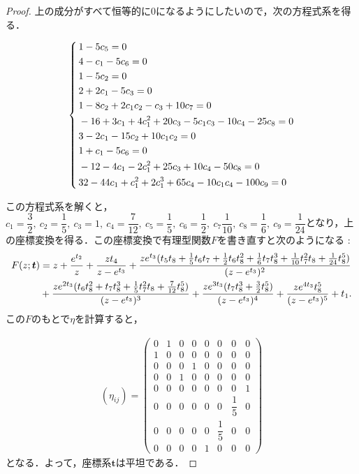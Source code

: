 \documentclass[a4paper,11pt]{jbook}
\theoremstyle{plain}
\theoremstyle{definition}
\theoremstyle{remark}
\theoremstyle{proof}
\numberwithin{equation}{section}
\begin{document}
\begin{proof}
\noindent 上の成分がすべて恒等的に$0$になるようにしたいので，次の方程式系を得る．

\begin{equation}
\left\{ \,
\begin{aligned}
	&1-5c_5=0 \\
	&4-c_1-5c_6=0 \\
	&1-5c_2=0 \\
	&2+2c_1-5c_3=0 \\
	&1-8c_2+2c_1c_2-c_3+10c_7=0 \\
	&-16+3c_1+4c_1^2+20c_3-5c_1c_3-10c_4-25c_8=0 \\
	&3-2c_1-15c_2+10c_1c_2=0 \\
	&1+c_1-5c_6=0 \\
	&-12-4c_1-2c_1^2+25c_3+10c_4-50c_8=0 \\
	&32-44c_1+c_1^2+2c_1^3+65c_4-10c_1c_4-100c_9=0
\end{aligned}\notag
\right.
\end{equation}

\noindent この方程式系を解くと，$c_1=\dfrac{3}{2},\ c_2=\dfrac{1}{5},\ c_3=1, \ c_4=\dfrac{7}{12}, \ c_5=\dfrac{1}{5}, \ c_6=\dfrac{1}{2},\ c_7\dfrac{1}{10},\ c_8=\dfrac{1}{6},\ c_9=\dfrac{1}{24}$となり，上の座標変換を得る．この座標変換で有理型関数$F$を書き直すと次のようになる : 
\begin{align}
F(z;\bm{t})&=z+\dfrac{e^{t_2}}{z}+\dfrac{zt_4}{z-e^{t_3}}+\dfrac{ze^{t_3}(t_5t_8+\frac{1}{5}t_6t_7+\frac{1}{2}t_6t_8^2+\frac{1}{6}t_7t_8^3+\frac{1}{10}t_7^2t_8+\frac{1}{24}t_8^5)}{(z-e^{t_3})^2} \notag \\
&+\dfrac{ze^{2t_3}(t_6t_8^2+t_7t_8^3+\frac{1}{5}t_7^2t_8+\frac{7}{12}t_8^5)}{(z-e^{t_3})^3}+\dfrac{ze^{3t_3}(t_7t_8^3+\frac{3}{2}t_8^5)}{(z-e^{t_3})^4}
+\dfrac{ze^{4t_3}t_8^5}{(z-e^{t_3})^5}+t_1.
\end{align}
この$F$のもとで$\eta$を計算すると，

\begin{align}
(\eta_{ij})=
\begin{pmatrix}
0&1&0&0&0&0&0&0\\
1&0&0&0&0&0&0&0\\
0&0&0&1&0&0&0&0\\
0&0&1&0&0&0&0&0\\
0&0&0&0&0&0&0&1\\
0&0&0&0&0&0&\dfrac{1}{5}&0\\
0&0&0&0&0&\dfrac{1}{5}&0&0\\
0&0&0&0&1&0&0&0
\end{pmatrix}
\end{align}
となる．よって，座標系$\bm{t}$は平坦である．
\end{proof}
\end{document}
